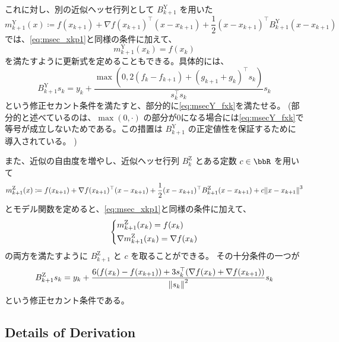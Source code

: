 \documentclass[a4paper, 10pt, dvipdfmx,draft]{article}
\newcommand{\defeq}{\coloneqq}
\begin{document}
これに対し、別の近似ヘッセ行列として $B^{\mathrm{Y}}_{k+1}$ を用いた
\begin{equation*}
    m_{k+1}^{\mathrm{Y}}(x) \defeq f(x_{k+1}) + \nabla f(x_{k+1})^\top (x - x_{k+1}) + \frac{1}{2} (x - x_{k+1})^\top B^{\mathrm{Y}}_{k+1} (x - x_{k+1})
\end{equation*}
では、\cref{eq:msec_xkp1}と同様の条件に加えて、
\begin{equation}\label{eq:msecY_fxk}
    m^{\mathrm{Y}}_{k+1}(x_k) = f(x_k)
\end{equation}
を満たすように更新式を定めることもできる。具体的には、
\begin{equation}\label{eq:msecY}
    B^{\mathrm{Y}}_{k+1}s_k = y_k + \frac{\max(0, 2(f_k- f_{k+1})+(g_{k+1}+g_k)^\top s_k)}{s_k^\top s_k} s_k
\end{equation}
という修正セカント条件を満たすと、部分的に\cref{eq:msecY_fxk}を満たせる。
(部分的と述べているのは、$\max(0, \cdot)$ の部分が0になる場合には\cref{eq:msecY_fxk}で等号が成立しないためである。この措置は $B^\mathrm{Y}_{k+1}$ の正定値性を保証するために導入されている。
)

また、近似の自由度を増やし、近似ヘッセ行列 $B_k^{\mathrm{Z}}$ とある定数 $c\in \bbR$ を用いて
\begin{equation*}
    m^\mathrm{Z}_{k+1}(x) \defeq f(x_{k+1}) + \nabla f(x_{k+1})^\top (x - x_{k+1}) + \frac{1}{2} (x - x_{k+1})^\top B_{k+1}^{\mathrm{Z}} (x - x_{k+1}) + c \norm{x-x_{k+1}}^3
\end{equation*}
とモデル関数を定めると、\cref{eq:msec_xkp1}と同様の条件に加えて、
\begin{equation}
    \begin{dcases}
        m^\mathrm{Z}_{k+1}(x_k) = f(x_k) \\
        \nabla m^\mathrm{Z}_{k+1}(x_k) = \nabla f(x_k)
    \end{dcases} \label{eq:msecZ_xk}
\end{equation}
の両方を満たすように $B^{\mathrm{Z}}_{k+1}$ と $c$ を取ることができる。
その十分条件の一つが
\begin{equation*}
    B^\mathrm{Z}_{k+1}s_k = y_k + \frac{6(f(x_k)-f(x_{k+1})) + 3 s_k^\top (\nabla f(x_k)+\nabla f(x_{k+1}))}{\norm{s_k}^2} s_k
\end{equation*}
という修正セカント条件である。

\subsection{Details of Derivation}
\end{document}
